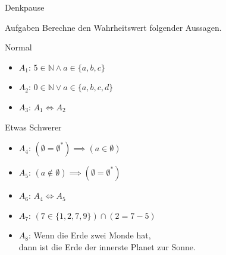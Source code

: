 {
\begin{frame}[fragile]{Denkpause}
    \begin{alertblock}{Aufgaben}
      Berechne den Wahrheitswert folgender Aussagen.
    \end{alertblock}
    \begin{block}{Normal}
    \begin{itemize}
        \item $A_1$: $5 \in \mathbb{N} \wedge a \in \{a, b, c\}$
        \item $A_2$: $0 \in \mathbb{N} \vee a \in \{a, b, c, d\}$
        \item $A_3$: $A_1 \iff A_2$
    \end{itemize}
    \end{block}
    \begin{block}{Etwas Schwerer}
    \begin{itemize}
        \item $A_4$: $(\emptyset=\emptyset^{*}) \implies (a \in \emptyset)$
        \item $A_5$: $(a \notin \emptyset) \implies (\emptyset = \emptyset^{*})$
        \item $A_6$: $A_4 \iff A_5$
        \item $A_7$: $(7 \in \{1, 2, 7, 9\}) \cap (2 = 7-5)$
        \item $A_8$: Wenn die Erde zwei Monde hat,\\
		\quad dann ist die Erde der innerste Planet zur Sonne.
    \end{itemize}
    \end{block}
\end{frame}
}


